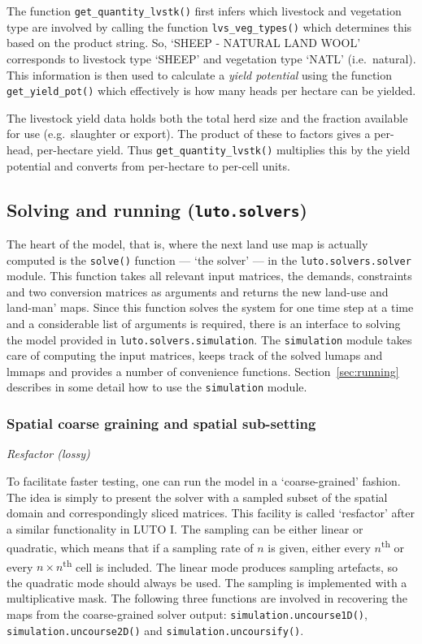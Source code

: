 \documentclass{draft}
\begin{document}
The function \texttt{get_quantity_lvstk()} first infers which livestock and vegetation type are involved by calling the function \texttt{lvs_veg_types()} which determines this based on the product string. So, `SHEEP - NATURAL LAND WOOL' corresponds to livestock type `SHEEP' and vegetation type `NATL' (i.e.\ natural). This information is then used to calculate a \emph{yield potential} using the function \texttt{get_yield_pot()} which effectively is how many heads per hectare can be yielded.

The livestock yield data holds both the total herd size and the fraction available for use (e.g.\ slaughter or export). The product of these to factors gives a per-head, per-hectare yield. Thus \texttt{get_quantity_lvstk()} multiplies this by the yield potential and converts from per-hectare to per-cell units.

\subsection{Solving and running (\texttt{luto.solvers})}\label{subsec:solvers}

The heart of the model, that is, where the next land use map is actually computed is the \texttt{solve()} function --- `the solver' --- in the \texttt{luto.solvers.solver} module. This function takes all relevant input matrices, the demands, constraints and two conversion matrices as arguments and returns the new land-use and land-man' maps. Since this function solves the system for one time step at a time and a considerable list of arguments is required, there is an interface to solving the model provided in \texttt{luto.solvers.simulation}. The \texttt{simulation} module takes care of computing the input matrices, keeps track of the solved lumaps and lmmaps and provides a number of convenience functions. Section~\ref{sec:running} describes in some detail how to use the \texttt{simulation} module.

\subsubsection{Spatial coarse graining and spatial sub-setting}

\emph{Resfactor (lossy)}

To facilitate faster testing, one can run the model in a `coarse-grained' fashion. The idea is simply to present the solver with a sampled subset of the spatial domain and correspondingly sliced matrices. This facility is called `resfactor' after a similar functionality in LUTO I. The sampling can be either linear or quadratic, which means that if a sampling rate of $n$ is given, either every $n$\textsuperscript{th} or every $n \times n$\textsuperscript{th} cell is included. The linear mode produces sampling artefacts, so the quadratic mode should always be used. The sampling is implemented with a multiplicative mask. The following three functions are involved in recovering the maps from the coarse-grained solver output: \texttt{simulation.uncourse1D()}, \texttt{simulation.uncourse2D()} and \texttt{simulation.uncoursify()}.
\end{document}
